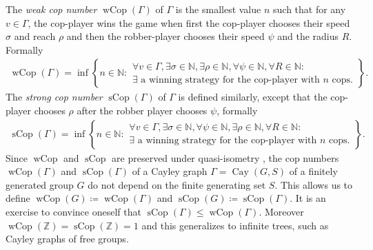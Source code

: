 \documentclass{amsart}
\theoremstyle{definition}
\theoremstyle{remark}
\theoremstyle{remark}
\theoremstyle{definition}
\newcommand{\sCop}{\operatorname{sCop}}
\newcommand{\wCop}{\operatorname{wCop}}
\newcommand{\Cay}{\operatorname{Cay}}
\renewcommand{\leq}{\leqslant}
\begin{document}
The \emph{weak cop number} $\wCop(\Gamma)$ of $\Gamma$ is the smallest value $n$ such that for any $v\in\Gamma$, the cop-player wins the game when first the cop-player chooses their speed $\sigma$ and reach $\rho$ and then the robber-player chooses their speed $\psi$ and the radius $R$. Formally
\begin{align*}
    \wCop(\Gamma) = \inf \left\{  n\in \mathbb{N} \colon  \begin{array}{l}
        \forall v \in \Gamma, \exists \sigma \in \mathbb{N}, \exists \rho \in \mathbb{N}, \forall \psi \in \mathbb{N}, \forall R \in \mathbb{N} \colon \\
        \exists\text{ a winning strategy for the cop-player with $n$ cops.}
    \end{array}
    \right\}.
\end{align*}
The \emph{strong cop number} $\sCop(\Gamma)$ of $\Gamma$ is defined similarly, except that the cop-player chooses $\rho$ after the robber player chooses $\psi$, formally
\begin{align*}
    \sCop(\Gamma) = \inf \left\{  n\in \mathbb{N} \colon  \begin{array}{l}
        \forall v \in \Gamma, \exists \sigma \in \mathbb{N}, \forall \psi \in \mathbb{N},  \exists \rho \in \mathbb{N}, \forall R \in \mathbb{N} \colon \\
        \exists\text{ a winning strategy for the cop-player with $n$ cops.}
    \end{array}
    \right\}.
\end{align*}
Since $\wCop$ and $\sCop$ are preserved under quasi-isometry \cite[Corollary G]{LMR23}, the cop numbers $\wCop(\Gamma)$ and $\sCop(\Gamma)$ of a Cayley graph $\Gamma = \Cay(G, S)$ of a finitely generated group $G$ do not depend on the finite generating set \(S\).
This allows us to define \(\wCop(G) \coloneq \wCop(\Gamma)\) and \(\sCop(G) \coloneq \sCop(\Gamma)\).
It is an exercise to convince oneself that $\sCop(\Gamma) \leq \wCop(\Gamma)$. Moreover $\wCop(\mathbb{Z}) = \sCop(\mathbb{Z}) = 1$ and this generalizes to infinite trees, such as Cayley graphs of free groups.
\end{document}
